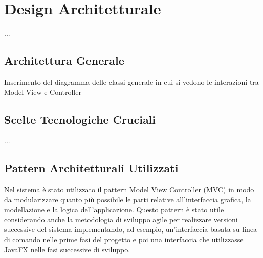 

\chapter{Design Architetturale}
    ...
    \section{Architettura Generale}
    Inserimento del diagramma delle classi generale in cui si vedono le interazioni tra Model View e Controller
    
    \section{Scelte Tecnologiche Cruciali}
    ...
    \section{Pattern Architetturali Utilizzati}
        Nel sistema è stato utilizzato il pattern Model View Controller (MVC) in modo da modularizzare quanto più possibile le parti relative all'interfaccia grafica, la modellazione e la logica dell'applicazione. 
        Questo pattern è stato utile considerando anche la metodologia di sviluppo agile per realizzare versioni successive del sistema implementando, ad esempio, un'interfaccia basata su linea di comando nelle prime fasi del progetto e poi una interfaccia che utilizzasse JavaFX nelle fasi successive di sviluppo.
        
